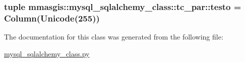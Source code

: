 \label{classmmasgis_1_1mysql__sqlalchemy__class_1_1tc__par_aae011588a95850fe4c53313ebf98c066}
\hypertarget{classmmasgis_1_1mysql__sqlalchemy__class_1_1tc__par_acf84628d798adba06d0a520f03f42f25}{
\subsubsection[{testo}]{\setlength{\rightskip}{0pt plus 5cm}tuple {\bf mmasgis::mysql\_\-sqlalchemy\_\-class::tc\_\-par::testo} = Column(Unicode(255))}}
\label{classmmasgis_1_1mysql__sqlalchemy__class_1_1tc__par_acf84628d798adba06d0a520f03f42f25}


The documentation for this class was generated from the following file:\begin{DoxyCompactItemize}
\item 
\hyperlink{mysql__sqlalchemy__class_8py}{mysql\_\-sqlalchemy\_\-class.py}\end{DoxyCompactItemize}
